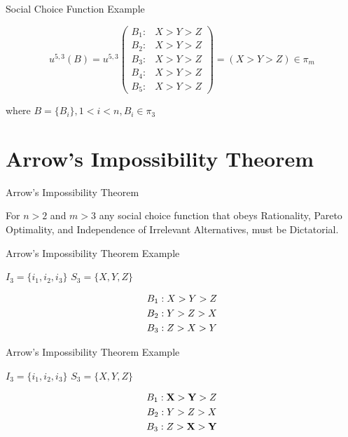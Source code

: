 \documentclass{beamer}
\begin{document}
\begin{frame}{Social Choice Function Example}

\large \begin{equation*}
  u^{5,3}(B) = u^{5,3}\left(
    \begin{array}{cc}
      B_1: & \text{$X > Y > Z$}\\
      B_2: & \text{$X > Y > Z$}\\
      B_3: & \text{$X > Y > Z$}\\
      B_4: & \text{$X > Y > Z$}\\ 
      B_5: & \text{$X > Y > Z$}
    \end{array} 
    \right) = (X > Y > Z) \in \pi_m
\end{equation*}

\vskip 0.5cm

\large where $B = \{B_i\}, 1 < i < n, B_i \in \pi_3$
\end{frame}

\section{Arrow's Impossibility Theorem}
\begin{frame}{Arrow's Impossibility Theorem}
    \begin{theorem}
    For $n > 2$ and $m > 3$ any social choice function that obeys Rationality, Pareto Optimality, and Independence of Irrelevant Alternatives, must be Dictatorial.
    \end{theorem}
\end{frame}

\begin{frame}{Arrow's Impossibility Theorem Example}

\huge 

$I_3 = \{i_1, i_2, i_3\}$ \hfill $S_3 = \{X, Y, Z\}$

\begin{align*}
    \huge B_1: X > Y > Z \\
    \huge B_2: Y > Z > X \\
    \huge B_3: Z > X > Y
\end{align*}
\end{frame}

\begin{frame}{Arrow's Impossibility Theorem Example}

\huge 

$I_3 = \{i_1, i_2, i_3\}$ \hfill $S_3 = \{X, Y, Z\}$

\begin{align*}
    \huge B_1: \mathbf{X > Y} > Z \\
    \huge B_2: Y > Z > X \\
    \huge B_3: Z > \mathbf{X > Y}
\end{align*}
\end{frame}
\end{document}
